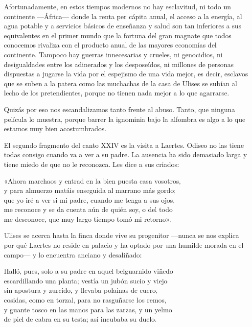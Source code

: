 Afortunadamente, en estos tiempos modernos no hay esclavitud, ni todo un continente ---África--- donde la renta per cápita anual, el acceso a la energía, al agua potable y a servicios básicos de enseñanza y salud son tan inferiores a sus equivalentes en el primer mundo que la fortuna del gran magnate que todos conocemos rivaliza con el producto anual de las mayores economías del continente. Tampoco hay guerras innecesarias y crueles, ni genocidios, ni desigualdades entre los adinerados y los desposeídos, ni millones de personas dispuestas a jugarse la vida por el espejismo de una vida mejor, es decir, esclavos que se suben a la patera como las muchachas de la casa de Ulises se subían al lecho de los pretendientes, porque no tienen nada mejor a lo que agarrarse.

Quizás por eso nos escandalizamos tanto frente al abuso. Tanto, que ninguna película lo muestra, porque barrer la ignominia bajo la alfombra es algo a lo que estamos muy bien acostumbrados.

El segundo fragmento del canto XXIV es la visita a Laertes. Odiseo no las tiene todas consigo cuando va a ver a su padre. La ausencia ha sido demasiado larga y tiene miedo de que no le reconozca. Les dice a sus criados:

\begin{versocita}
«Ahora marchaos y entrad en la bien puesta casa vosotros,\\
y para almuerzo matáis enseguida al marrano más gordo;\\
que yo iré a ver si mi padre, cuando me tenga a sus ojos,\\
me reconoce y se da cuenta aún de quién soy, o del todo\\
me desconoce, que muy largo tiempo tomó mi retorno».
\end{versocita}

Ulises se acerca hasta la finca donde vive su progenitor ---nunca se nos explica por qué Laertes no reside en palacio y ha optado por una humilde morada en el campo--- y lo encuentra anciano y desaliñado:

\begin{versocita}
Halló, pues, solo a su padre en aquel belguarnido viñedo\\
escardillando una planta; vestía un jubón sucio y viejo\\
sin apostura y zurcido, y llevaba polainas de cuero,\\
cosidas, como en torzal, para no rasguñarse los remos,\\
y guante tosco en las manos para las zarzas, y un yelmo\\
de piel de cabra en su testa; así incubaba su duelo.
\end{versocita}


